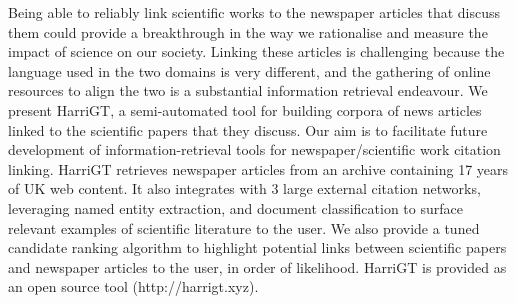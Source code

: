 Being able to reliably link scientific works to the newspaper articles that discuss them could provide a breakthrough in the way we rationalise and measure the impact of science on our society.  Linking these articles is challenging because the language used in the two domains is very different, and the gathering of online resources to align the two is a substantial information retrieval endeavour. We present HarriGT, a semi-automated tool for building corpora of news articles linked to the scientific papers that they discuss. Our aim is to facilitate future development of information-retrieval tools for newspaper/scientific work citation linking.  HarriGT retrieves newspaper articles from an archive containing 17 years of UK web content.  It also integrates with 3 large external citation networks, leveraging named entity extraction, and document classification to surface relevant examples of scientific literature to the user.  We also provide a tuned candidate ranking algorithm to highlight potential links between scientific papers and newspaper articles to the user, in order of likelihood. HarriGT is provided as an open source tool (http://harrigt.xyz).
